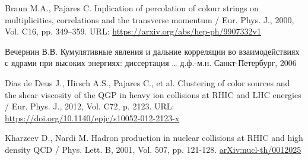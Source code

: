 \begin{thebibliography}{24}
Braun M.A., Pajares C. 
Inplication of percolation of colour strings on multiplicities, correlations and the transverse momentum /
Eur. Phys. J.,
2000,
Vol. C16,
pp. 349–359.
URL: \url{https://arxiv.org/abs/hep-ph/9907332v1}

Вечернин В.В.
Кумулятивные явления и дальние корреляции во взаимодействиях с ядрами при высоких энергиях:
диссертация … д.ф.-м.н. Санкт-Петербург, 2006

Dias de Deus J., Hirsch A.S., Pajares C., et al.
Clustering of color sources and the shear viscosity of the QGP in heavy ion collisions at RHIC and LHC energies /
Eur. Phys. J., 
2012,
Vol. C72,
p. 2123.
URL: \url{https://doi.org/10.1140/epjc/s10052-012-2123-x}

Kharzeev D., Nardi M.
Hadron production in nuclear collisions at RHIC and high density QCD /
Phys. Lett. B,
2001,
Vol. 507,
pp. 121-128.
\href{https://arxiv.org/abs/nucl-th/0012025}{arXiv:nucl-th/0012025}

\end{thebibliography}
